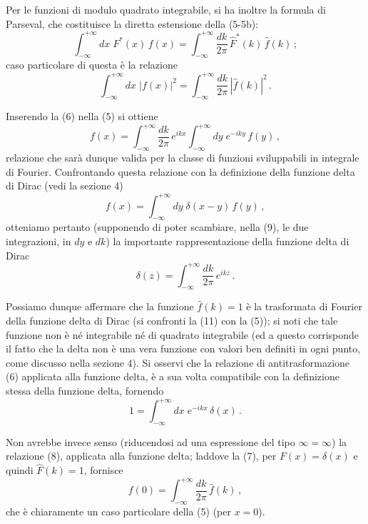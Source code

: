 \documentclass[11pt, a4paper]{book}
\numberwithin{equation}{section}
\begin{document}
Per le funzioni di modulo quadrato integrabile, si ha inoltre la formula di Parseval, che costituisce la diretta estensione della (5-5b):
\begin{equation}
  \int_{-\infty}^{+\infty} dx\;F^*(x)\,f(x)
  = \int_{-\infty}^{+\infty}\frac{dk}{2\pi}\,\hat{F}^*(k)\,\hat{f}(k)\,; \tag{7}
\end{equation}
caso particolare di questa è la relazione
\begin{equation}
  \int_{-\infty}^{+\infty} dx\;|f(x)|^2
  = \int_{-\infty}^{+\infty}\frac{dk}{2\pi}\,|\hat{f}(k)|^2\,. \tag{8}
\end{equation}

Inserendo la (6) nella (5) si ottiene
\begin{equation}
  f(x) = \int_{-\infty}^{+\infty}\frac{dk}{2\pi}\,e^{ikx}
  \int_{-\infty}^{+\infty} dy\;e^{-iky}\,f(y)\,, \tag{9}
\end{equation}
relazione che sarà dunque valida per la classe di funzioni sviluppabili   in integrale di Fourier. Confrontando questa relazione con la definizione della funzione delta di Dirac (vedi la sezione 4)
\begin{equation}
  f(x) = \int_{-\infty}^{+\infty} dy\;\delta(x-y)\,f(y)\,, \tag{10}
\end{equation}
otteniamo pertanto (supponendo di poter scambiare, nella (9), le due integrazioni, in $dy$ e $dk$) la importante rappresentazione della funzione delta di Dirac
\begin{equation}
  \delta(z) = \int_{-\infty}^{+\infty}\frac{dk}{2\pi}\,e^{ikz}\,. \tag{11}
\end{equation}

Possiamo dunque affermare che la funzione $\hat{f}(k)=1$ è la trasformata di Fourier della funzione delta di Dirac (si confronti la (11) con la (5)); si noti che tale funzione non è né integrabile né di quadrato integrabile (ed a questo corrisponde il fatto che la delta non è una vera funzione con valori ben definiti in ogni punto, come discusso nella sezione 4). Si osservi che la relazione di antitrasformazione (6) applicata alla funzione delta, è a sua volta compatibile con la definizione stessa della funzione delta, fornendo
\begin{equation}
  1 = \int_{-\infty}^{+\infty} dx\;e^{-ikx}\,\delta(x)\,. \tag{12}
\end{equation}

Non avrebbe invece senso (riducendosi ad una espressione del tipo $\infty=\infty$) la relazione (8), applicata alla funzione delta; laddove la (7), per $F(x)=\delta(x)$ e quindi $\hat{F}(k)=1$, fornisce
\begin{equation}
  f(0) = \int_{-\infty}^{+\infty}\frac{dk}{2\pi}\,\hat{f}(k)\,, \tag{13}
\end{equation}
che è chiaramente un caso particolare della (5) (per $x=0$).
\end{document}

